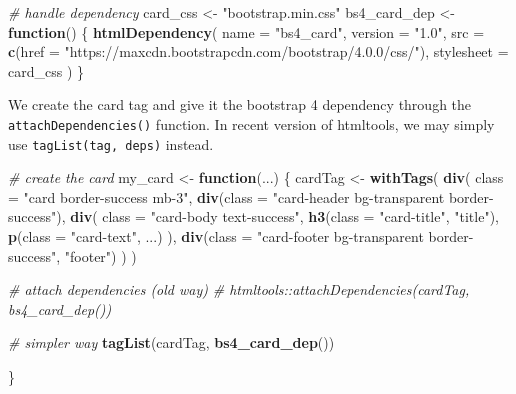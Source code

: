 \documentclass[
]{book}
\newenvironment{Shaded}{\begin{snugshade}}{\end{snugshade}}
\newcommand{\CommentTok}[1]{\textcolor[rgb]{0.56,0.35,0.01}{\textit{#1}}}
\newcommand{\ControlFlowTok}[1]{\textcolor[rgb]{0.13,0.29,0.53}{\textbf{#1}}}
\newcommand{\DataTypeTok}[1]{\textcolor[rgb]{0.13,0.29,0.53}{#1}}
\newcommand{\KeywordTok}[1]{\textcolor[rgb]{0.13,0.29,0.53}{\textbf{#1}}}
\newcommand{\NormalTok}[1]{#1}
\newcommand{\StringTok}[1]{\textcolor[rgb]{0.31,0.60,0.02}{#1}}
\begin{document}
\begin{Shaded}
\begin{Highlighting}[]
\CommentTok{# handle dependency}
\NormalTok{card_css <-}\StringTok{ "bootstrap.min.css"}
\NormalTok{bs4_card_dep <-}\StringTok{ }\ControlFlowTok{function}\NormalTok{() \{}
  \KeywordTok{htmlDependency}\NormalTok{(}
    \DataTypeTok{name =} \StringTok{"bs4_card"}\NormalTok{,}
    \DataTypeTok{version =} \StringTok{"1.0"}\NormalTok{,}
    \DataTypeTok{src =} \KeywordTok{c}\NormalTok{(}\DataTypeTok{href =} \StringTok{"https://maxcdn.bootstrapcdn.com/bootstrap/4.0.0/css/"}\NormalTok{),}
    \DataTypeTok{stylesheet =}\NormalTok{ card_css}
\NormalTok{  )}
\NormalTok{\}}
\end{Highlighting}
\end{Shaded}

We create the card tag and give it the bootstrap 4 dependency through the \texttt{attachDependencies()} function. In recent version of htmltools, we may simply use
\texttt{tagList(tag,\ deps)} instead.

\begin{Shaded}
\begin{Highlighting}[]
\CommentTok{# create the card}
\NormalTok{my_card <-}\StringTok{ }\ControlFlowTok{function}\NormalTok{(...) \{}
\NormalTok{  cardTag <-}\StringTok{ }\KeywordTok{withTags}\NormalTok{(}
    \KeywordTok{div}\NormalTok{(}
      \DataTypeTok{class =} \StringTok{"card border-success mb-3"}\NormalTok{,}
      \KeywordTok{div}\NormalTok{(}\DataTypeTok{class =} \StringTok{"card-header bg-transparent border-success"}\NormalTok{),}
      \KeywordTok{div}\NormalTok{(}
        \DataTypeTok{class =} \StringTok{"card-body text-success"}\NormalTok{,}
        \KeywordTok{h3}\NormalTok{(}\DataTypeTok{class =} \StringTok{"card-title"}\NormalTok{, }\StringTok{"title"}\NormalTok{),}
        \KeywordTok{p}\NormalTok{(}\DataTypeTok{class =} \StringTok{"card-text"}\NormalTok{, ...)}
\NormalTok{      ),}
      \KeywordTok{div}\NormalTok{(}\DataTypeTok{class =} \StringTok{"card-footer bg-transparent border-success"}\NormalTok{, }\StringTok{"footer"}\NormalTok{)}
\NormalTok{    )}
\NormalTok{  )}
  
  \CommentTok{# attach dependencies (old way)}
  \CommentTok{# htmltools::attachDependencies(cardTag, bs4_card_dep())}
  
  \CommentTok{# simpler way}
  \KeywordTok{tagList}\NormalTok{(cardTag, }\KeywordTok{bs4_card_dep}\NormalTok{())}
  
\NormalTok{\}}
\end{Highlighting}
\end{Shaded}
\end{document}
